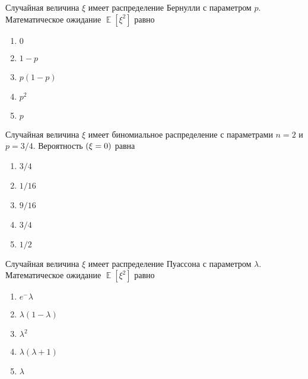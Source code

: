 \documentclass[t]{beamer}
\DeclareMathOperator{\E}{\mathbb{E}}
\let\P\relax
\DeclareMathOperator{\P}{\mathbb{P}}
\begin{document}
 \begin{frame} \label{25} 
\begin{block}{25} 

Случайная величина $\xi$ имеет распределение Бернулли с параметром $p$. Математическое ожидание $\E[\xi^2]$ равно
  


 \end{block} 
\begin{enumerate} 
\item[] \hyperlink{25-No}{\beamergotobutton{} $0$}
\item[] \hyperlink{25-No}{\beamergotobutton{} $1-p$}
\item[] \hyperlink{25-No}{\beamergotobutton{} $p(1-p)$}
\item[] \hyperlink{25-No}{\beamergotobutton{} $p^2$}
\item[] \hyperlink{25-Yes}{\beamergotobutton{} $p$}
\end{enumerate} 
\end{frame} 


 \begin{frame} \label{26} 
\begin{block}{26} 

Случайная величина $\xi$ имеет биномиальное распределение с параметрами $n = 2$ и $p = 3/4$. Вероятность $\P(\xi = 0)$ равна
  


 \end{block} 
\begin{enumerate} 
\item[] \hyperlink{26-No}{\beamergotobutton{} $3/4$}
\item[] \hyperlink{26-Yes}{\beamergotobutton{} $1/16$}
\item[] \hyperlink{26-No}{\beamergotobutton{} $9/16$}
\item[] \hyperlink{26-No}{\beamergotobutton{} $3/4$}
\item[] \hyperlink{26-No}{\beamergotobutton{} $1/2$}
\end{enumerate} 
\end{frame} 


 \begin{frame} \label{27} 
\begin{block}{27} 

Случайная величина $\xi$ имеет распределение Пуассона с параметром $\lambda$. Математическое ожидание $\E[\xi^2]$ равно
  


 \end{block} 
\begin{enumerate} 
\item[] \hyperlink{27-No}{\beamergotobutton{} $e^-\lambda$}
\item[] \hyperlink{27-No}{\beamergotobutton{} $\lambda(1 - \lambda)$}
\item[] \hyperlink{27-No}{\beamergotobutton{} $\lambda^2$}
\item[] \hyperlink{27-Yes}{\beamergotobutton{} $\lambda(\lambda+1)$}
\item[] \hyperlink{27-No}{\beamergotobutton{} $\lambda$}
\end{enumerate} 
\end{frame} 
\end{document}
